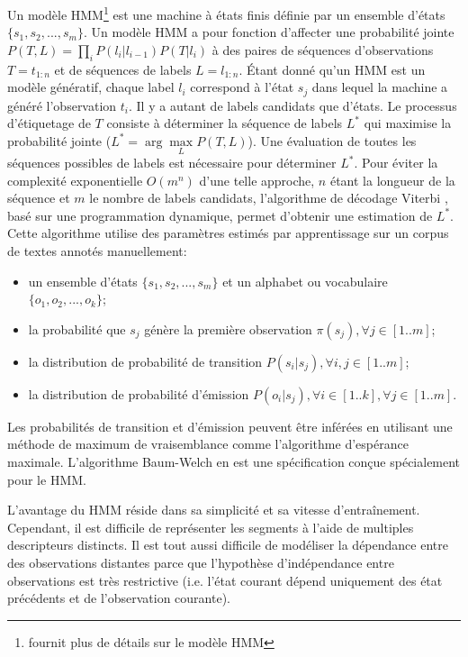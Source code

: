 Un modèle HMM\footnote{\citet{rabiner1989tutorial} fournit plus de détails sur le modèle HMM} est une machine à états finis définie par un ensemble d'états $ \lbrace s_1, s_2, ..., s_m \rbrace $. Un modèle HMM a pour fonction d'affecter une probabilité jointe 
$ P (T , L) = \prod\limits_i P(l_i \vert l_{i-1})P(T \vert l_i)$  à des paires de séquences d'observations $ T = t_{1: n} $ et de séquences de labels $ L = l_{1:n} $. Étant donné qu'un HMM est un modèle génératif, chaque label $l_i$ correspond à l'état $s_j$ dans lequel la machine a généré l'observation $t_i$. Il y a autant de labels candidats que d'états. Le processus d'étiquetage de $T$ consiste à déterminer la séquence de labels $ L^* $ qui maximise la probabilité jointe ($L^* = \arg \max\limits_L P(T, L)$). Une évaluation de toutes les séquences possibles de labels est nécessaire pour déterminer $L^*$. Pour éviter la complexité exponentielle $ O(m^n)$ d'une telle approche, $n$ étant la longueur de la séquence et $m$ le nombre de labels candidats, l'algorithme de décodage Viterbi \citep{viterbi1967viterbi}, basé sur une programmation dynamique, permet d'obtenir une estimation de $L^*$. Cette algorithme utilise des paramètres estimés par apprentissage sur un corpus de textes annotés manuellement:
\begin{itemize}
\item un ensemble d'états $ \lbrace s_1, s_2, ..., s_m \rbrace $ et un alphabet ou vocabulaire $ \lbrace o_1, o_2, ..., o_k \rbrace $;
\item la probabilité que $ s_j $ génère la première observation $ \pi(s_j), \forall j \in [1 .. m] $;
\item la distribution de probabilité de transition $ P (s_i\vert s_j),  \forall i,j \in [1 .. m] $;
\item la distribution de probabilité d'émission $ P(o_i\vert s_j), \forall i \in [1 .. k], \forall j \in [1 .. m]$.
\end{itemize}

Les probabilités de transition et d'émission peuvent être inférées en utilisant une méthode de maximum de vraisemblance comme l'algorithme d'espérance maximale. L'algorithme Baum-Welch \citep{welch2003baumwelch} en est une spécification conçue spécialement pour le HMM. 

L'avantage du HMM réside dans sa simplicité et sa vitesse d'entraînement. Cependant, il est difficile de représenter les segments à l'aide de multiples descripteurs distincts. Il est tout aussi difficile de modéliser la dépendance entre des observations distantes parce que l'hypothèse d'indépendance entre observations est très restrictive (i.e. l'état courant dépend uniquement des état précédents et de l'observation courante).

